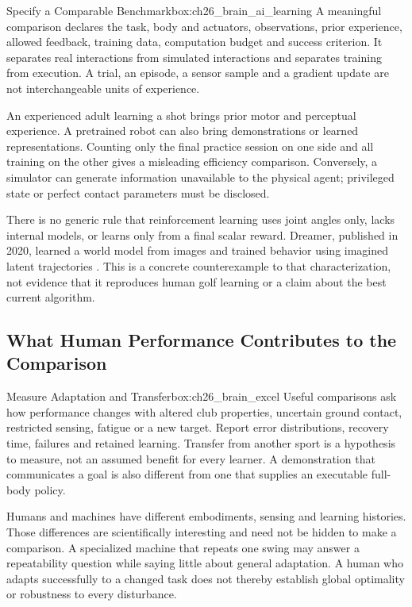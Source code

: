 \begin{principle}{Specify a Comparable Benchmark}{box:ch26_brain_ai_learning}
A meaningful comparison declares the task, body and actuators, observations, prior experience, allowed feedback, training data, computation budget and success criterion. It separates real interactions from simulated interactions and separates training from execution. A trial, an episode, a sensor sample and a gradient update are not interchangeable units of experience.
\end{principle}

An experienced adult learning a shot brings prior motor and perceptual experience. A pretrained robot can also bring demonstrations or learned representations. Counting only the final practice session on one side and all training on the other gives a misleading efficiency comparison. Conversely, a simulator can generate information unavailable to the physical agent; privileged state or perfect contact parameters must be disclosed.

There is no generic rule that reinforcement learning uses joint angles only, lacks internal models, or learns only from a final scalar reward. Dreamer, published in 2020, learned a world model from images and trained behavior using imagined latent trajectories \citep{dreamer2020scalable}. This is a concrete counterexample to that characterization, not evidence that it reproduces human golf learning or a claim about the best current algorithm.

\subsection{What Human Performance Contributes to the Comparison}
\label{subsec:ch26_brain_better}

\begin{principle}{Measure Adaptation and Transfer}{box:ch26_brain_excel}
Useful comparisons ask how performance changes with altered club properties, uncertain ground contact, restricted sensing, fatigue or a new target. Report error distributions, recovery time, failures and retained learning. Transfer from another sport is a hypothesis to measure, not an assumed benefit for every learner. A demonstration that communicates a goal is also different from one that supplies an executable full-body policy.
\end{principle}

Humans and machines have different embodiments, sensing and learning histories. Those differences are scientifically interesting and need not be hidden to make a comparison. A specialized machine that repeats one swing may answer a repeatability question while saying little about general adaptation. A human who adapts successfully to a changed task does not thereby establish global optimality or robustness to every disturbance.

